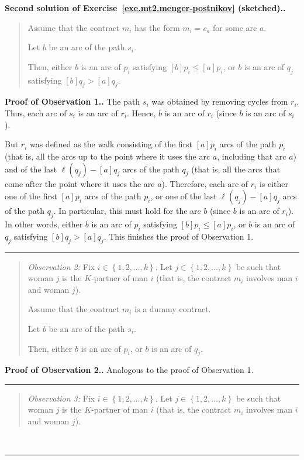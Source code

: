\documentclass[numbers=enddot,12pt,final,onecolumn,notitlepage]{scrartcl}%
\theoremstyle{definition}
\newenvironment{statement}{\begin{quote}}{\end{quote}}
\newenvironment{proof}[1][Proof]{\noindent\textbf{#1.} }{\ \rule{0.5em}{0.5em}}
\newcommand{\set}[1]{\left\{ #1 \right\}}
\newcommand{\tup}[1]{\left( #1 \right)}
\newcommand{\ive}[1]{\left[ #1 \right]}
\begin{document}
\begin{proof}[Second solution of
Exercise~\ref{exe.mt2.menger-postnikov} (sketched).]
\begin{statement}
Assume that the contract $m_i$ has the form
$m_i = c_a$ for some arc $a$.

Let $b$ be an arc of the path $s_i$.

Then, either $b$ is an arc of $p_i$ satisfying
$\ive{b} p_i \leq \ive{a} p_i$,
or $b$ is an arc of $q_j$ satisfying
$\ive{b} q_j > \ive{a} q_j$.
\end{statement}

\begin{proof}[Proof of Observation 1.]
The path $s_i$ was obtained by removing cycles from $r_i$.
Thus, each arc of $s_i$ is an arc of $r_i$.
Hence, $b$ is an arc of $r_i$ (since $b$ is an arc of $s_i$).

But $r_i$ was defined as the walk consisting of the first
$\ive{a} p_i$ arcs of the path $p_i$
(that is, all the arcs up to the point where it uses
the arc $a$, including that arc $a$) and of the
last $\ell\tup{q_j} - \ive{a} q_j$ arcs of the path
$q_j$ (that is, all the arcs that come after the point
where it uses the arc $a$).
Therefore, each arc of $r_i$ is either one of the first
$\ive{a} p_i$ arcs of the path $p_i$,
or one of the last $\ell\tup{q_j} - \ive{a} q_j$ arcs of the path
$q_j$.
In particular, this must hold for the arc $b$
(since $b$ is an arc of $r_i$).
In other words, either $b$ is an arc of $p_i$ satisfying
$\ive{b} p_i \leq \ive{a} p_i$,
or $b$ is an arc of $q_j$ satisfying
$\ive{b} q_j > \ive{a} q_j$.
This finishes the proof of Observation 1.
\end{proof}

\begin{statement}
\textit{Observation 2:}
Fix $i \in \set{1, 2, \ldots, k}$.
Let $j \in \set{1, 2, \ldots, k}$ be such that woman $j$ is
the $K$-partner of man $i$
(that is, the contract $m_i$ involves man $i$ and woman $j$).

Assume that the contract $m_i$ is a dummy contract.

Let $b$ be an arc of the path $s_i$.

Then, either $b$ is an arc of $p_i$,
or $b$ is an arc of $q_j$.
\end{statement}

\begin{proof}[Proof of Observation 2.]
Analogous to the proof of Observation 1.
\end{proof}

\begin{statement}
\textit{Observation 3:}
Fix $i \in \set{1, 2, \ldots, k}$.
Let $j \in \set{1, 2, \ldots, k}$ be such that woman $j$ is
the $K$-partner of man $i$
(that is, the contract $m_i$ involves man $i$ and woman $j$).


\end{statement}
\end{proof}
\end{document}
